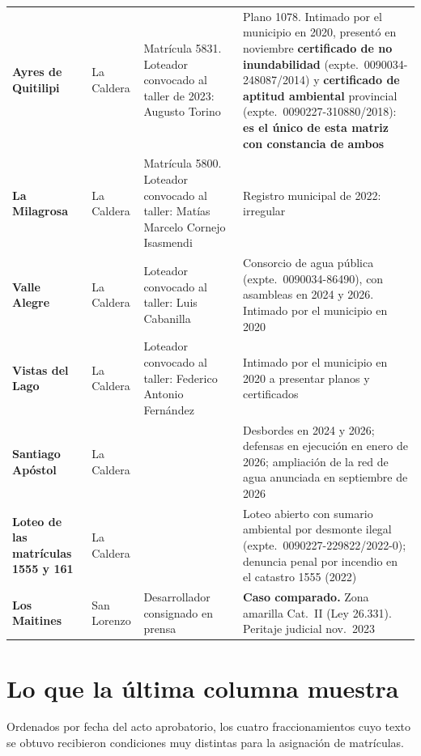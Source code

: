\begin{longtable}{@{}p{2.8cm}p{1.4cm}p{3.2cm}p{5.1cm}@{}}
\textbf{Ayres de Quitilipi} & La Caldera & Matrícula 5831. Loteador convocado al taller de 2023: Augusto Torino & Plano 1078. Intimado por el municipio en 2020, presentó en noviembre \textbf{certificado de no inundabilidad} (expte.\ 0090034-248087/2014) y \textbf{certificado de aptitud ambiental} provincial (expte.\ 0090227-310880/2018): \textbf{es el único de esta matriz con constancia de ambos} \\
\addlinespace

\textbf{La Milagrosa} & La Caldera & Matrícula 5800. Loteador convocado al taller: Matías Marcelo Cornejo Isasmendi & Registro municipal de 2022: irregular \\
\addlinespace

\textbf{Valle Alegre} & La Caldera & Loteador convocado al taller: Luis Cabanilla & Consorcio de agua pública (expte.\ 0090034-86490), con asambleas en 2024 y 2026. Intimado por el municipio en 2020 \\
\addlinespace

\textbf{Vistas del Lago} & La Caldera & Loteador convocado al taller: Federico Antonio Fernández & Intimado por el municipio en 2020 a presentar planos y certificados \\
\addlinespace

\textbf{Santiago Apóstol} & La Caldera &  & Desbordes en 2024 y 2026; defensas en ejecución en enero de 2026; ampliación de la red de agua anunciada en septiembre de 2026 \\
\addlinespace

\textbf{Loteo de las matrículas 1555 y 161} & La Caldera &  & Loteo abierto con sumario ambiental por desmonte ilegal (expte.\ 0090227-229822/2022-0); denuncia penal por incendio en el catastro 1555 (2022) \\
\addlinespace

\textbf{Los Maitines} & San Lorenzo & Desarrollador consignado en prensa & \textbf{Caso comparado.} Zona amarilla Cat.\ II (Ley 26.331). Peritaje judicial nov.\ 2023 \\
\bottomrule
\end{longtable}

\section*{Lo que la última columna muestra}

Ordenados por fecha del acto aprobatorio, los cuatro fraccionamientos cuyo texto se obtuvo
recibieron condiciones muy distintas para la asignación de matrículas.

